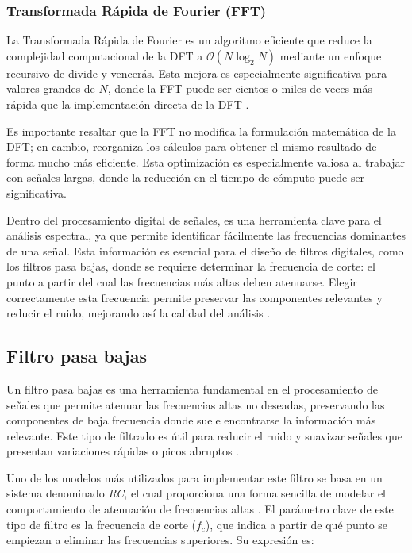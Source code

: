\documentclass[letterpaper,11pt]{article}
\begin{document}
\subsubsection{Transformada Rápida de Fourier (FFT)}
 La Transformada Rápida de Fourier es un algoritmo eficiente que reduce la complejidad computacional de la DFT a \( \mathcal{O}(N \log_2 N) \) mediante un enfoque recursivo de divide y vencerás. Esta mejora es especialmente significativa para valores grandes de \( N \), donde la FFT puede ser cientos o miles de veces más rápida que la implementación directa de la DFT \cite{oppenheim2010}.

 Es importante resaltar que la FFT no modifica la formulación matemática de la DFT; en cambio, reorganiza los cálculos para obtener el mismo resultado de forma mucho más eficiente. Esta optimización es especialmente valiosa al trabajar con señales largas, donde la reducción en el tiempo de cómputo puede ser significativa.

Dentro del procesamiento digital de señales, es una herramienta clave para el análisis espectral, ya que permite identificar fácilmente las frecuencias dominantes de una señal. Esta información es esencial para el diseño de filtros digitales, como los filtros pasa bajas, donde se requiere determinar la frecuencia de corte: el punto a partir del cual las frecuencias más altas deben atenuarse. Elegir correctamente esta frecuencia permite preservar las componentes relevantes y reducir el ruido, mejorando así la calidad del análisis \cite{oppenheim2010}.

\subsection{Filtro pasa bajas}
Un filtro pasa bajas es una herramienta fundamental en el procesamiento de señales que permite atenuar las frecuencias altas no deseadas, preservando las componentes de baja frecuencia donde suele encontrarse la información más relevante. Este tipo de filtrado es útil para reducir el ruido y suavizar señales que presentan variaciones rápidas o picos abruptos \cite{udlapsf}.

Uno de los modelos más utilizados para implementar este filtro se basa en un sistema denominado \textit{RC}, el cual proporciona una forma sencilla de modelar el comportamiento de atenuación de frecuencias altas \cite{udlapsf}. El parámetro clave de este tipo de filtro es la frecuencia de corte (\( f_c \)), que indica a partir de qué punto se empiezan a eliminar las frecuencias superiores. Su expresión es:
\end{document}
